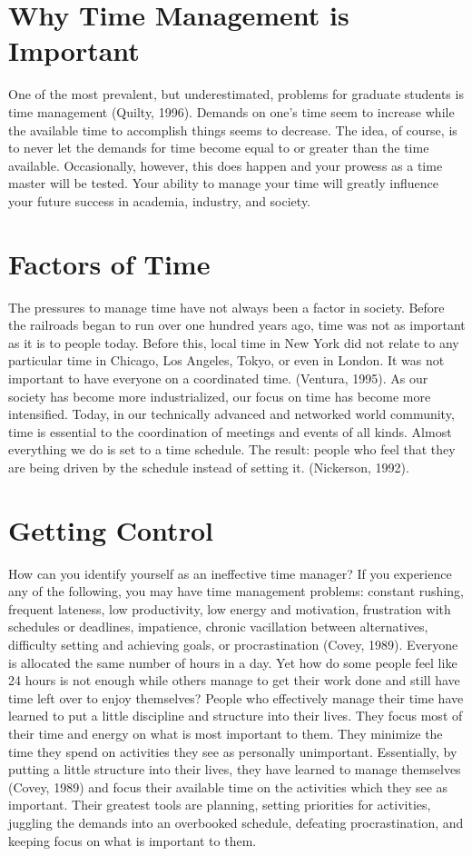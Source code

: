 \documentclass[twocolumn]{article}
\begin{document}
\section*{Why Time Management is Important}
\noindent
One of the most prevalent, but underestimated, problems for graduate students is
time management (Quilty, 1996). Demands on one's time seem to increase while the
available time to accomplish things seems to decrease. The idea, of course, is to
never let the demands for time become equal to or greater than the time available.
Occasionally, however, this does happen and your prowess as a time master will be
tested. Your ability to manage your time will greatly influence your future success
in academia, industry, and society.

\section*{Factors of Time}
\noindent
The pressures to manage time have not always been a factor in society. Before the
railroads began to run over one hundred years ago, time was not as important as
it is to people today. Before this, local time in New York did not relate to any
particular time in Chicago, Los Angeles, Tokyo, or even in London. It was not
important to have everyone on a coordinated time. (Ventura, 1995). As our society
has become more industrialized, our focus on time has become more intensified.
Today, in our technically advanced and networked world community, time is
essential to the coordination of meetings and events of all kinds.
Almost everything we do is set to a time schedule. The result: people who feel
that they are being driven by the schedule instead of setting it. (Nickerson, 1992).

\section*{Getting Control}
\noindent
How can you identify yourself as an ineffective time manager? If you experience
any of the following, you may have time management problems: constant rushing,
frequent lateness, low productivity, low energy and motivation, frustration with
schedules or deadlines, impatience, chronic vacillation between alternatives,
difficulty setting and achieving goals, or procrastination (Covey, 1989).
Everyone is allocated the same number of hours in a day. Yet how do some people
feel like 24 hours is not enough while others manage to get their work done and
still have time left over to enjoy themselves? People who effectively manage
their time have learned to put a little discipline and structure into their lives.
They focus most of their time and energy on what is most important to them.
They minimize the time they spend on activities they see as personally
unimportant. Essentially, by putting a little structure into their lives,
they have learned to manage themselves (Covey, 1989) and focus their available
time on the activities which they see as important. Their greatest tools are
planning, setting priorities for activities, juggling the demands into an
overbooked schedule, defeating procrastination, and keeping focus on what is
important to them.
\end{document}
